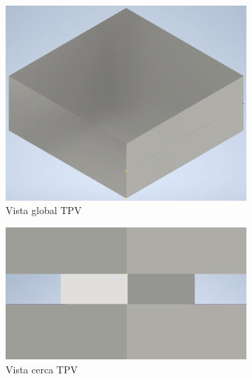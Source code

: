 \begin{figure}[H]
	\centering
	\begin{subfigure}[b]{0.3\textwidth}
		\centering
			\includegraphics[width=1.00\textwidth]{figuras/Procedimiento_Simulaciones/Conduccion/modelado3D_lejos.png}
		\caption{Vista global TPV}
		\label{fig:modelado3D_lejos}
	\end{subfigure}
	\hfill
	\begin{subfigure}[b]{0.3\textwidth}
		\centering
			\includegraphics[width=1.00\textwidth]{figuras/Procedimiento_Simulaciones/Conduccion/modelado3D_cerca.png}
		\caption{Vista cerca TPV}
		\label{fig:modelado3D_cerca}
	\end{subfigure}
	\hfill
	\begin{subfigure}[b]{0.3\textwidth}
		\centering

\end{subfigure}
\end{figure}
